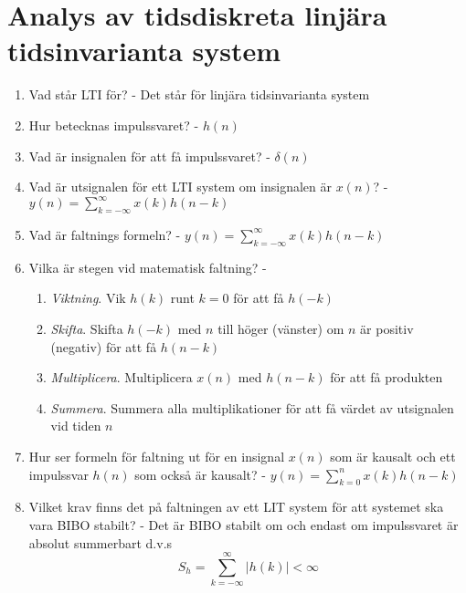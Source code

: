 \documentclass[11pt]{report}
\begin{document}
\section{Analys av tidsdiskreta linjära tidsinvarianta system}
\begin{enumerate}
	\item Vad står LTI för? - Det står för linjära tidsinvarianta system 
	\item Hur betecknas impulssvaret? - $h(n)$
	\item Vad är insignalen för att få impulssvaret? - $\delta(n)$
	\item Vad är utsignalen för ett LTI system om insignalen är $x(n)$? - $y(n)=\sum^\infty_{k=-\infty}x(k)h(n-k)$
	\item Vad är faltnings formeln? - $y(n)=\sum^\infty_{k=-\infty}x(k)h(n-k)$
	\item Vilka är stegen vid matematisk faltning? - \begin{enumerate}
		\item \emph{Viktning}. Vik $h(k)$ runt $k=0$ för att få $h(-k)$
		\item \emph{Skifta}. Skifta $h(-k)$ med $n$ till höger (vänster) om $n$ är positiv (negativ) för att få $h(n-k)$
		\item \emph{Multiplicera}. Multiplicera $x(n)$ med $h(n-k)$ för att få produkten 
		\item \emph{Summera}. Summera alla multiplikationer för att få värdet av utsignalen vid tiden $n$
		\end{enumerate}
	\item Hur ser formeln för faltning ut för en insignal $x(n)$ som är kausalt och ett impulssvar $h(n)$ som också är kausalt? - $y(n)=\sum^n_{k=0}x(k)h(n-k)$
	\item Vilket krav finns det på faltningen av ett LIT system för att systemet ska vara BIBO stabilt? - Det är BIBO stabilt om och endast om impulssvaret är absolut summerbart d.v.s \[ S_h = \sum^\infty_{k=-\infty} |h(k)| < \infty \]
	\end{enumerate}

	
	
\end{document}
